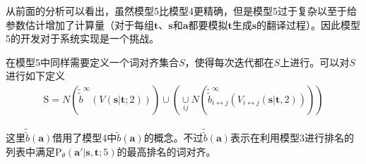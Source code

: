 \begin{appendices}
\parinterval 从前面的分析可以看出，虽然模型5比模型4更精确，但是模型5过于复杂以至于给参数估计增加了计算量（对于每组$\mathbf{t}$、$\mathbf{s}$和$\mathbf{a}$都要模拟$\mathbf{t}$生成$\mathbf{s}$的翻译过程）。因此模型5的开发对于系统实现是一个挑战。

\parinterval 在模型5中同样需要定义一个词对齐集合$S$，使得每次迭代都在$S$上进行。可以对$S$进行如下定义
\begin{eqnarray}
\textrm{S} = N(\tilde{\tilde{b}}^{\infty}(V(\mathbf{s}|\mathbf{t};2))) \cup (\mathop{\cup}\limits_{ij} N(\tilde{\tilde{b}}_{i \leftrightarrow j}^{\infty}(V_{i \leftrightarrow j}(\mathbf{s}|\mathbf{t},2))))
\label{eq:1.29}
\end{eqnarray}
\vspace{0.5em}

\parinterval 这里$\tilde{\tilde{b}}(\mathbf{a})$借用了模型4中$\tilde{b}(\mathbf{a})$的概念。不过$\tilde{\tilde{b}}(\mathbf{a})$表示在利用模型3进行排名的列表中满足$\textrm{P}_{\theta}(\mathbf{a}'|\mathbf{s},\mathbf{t};5)$的最高排名的词对齐。
\end{appendices}














